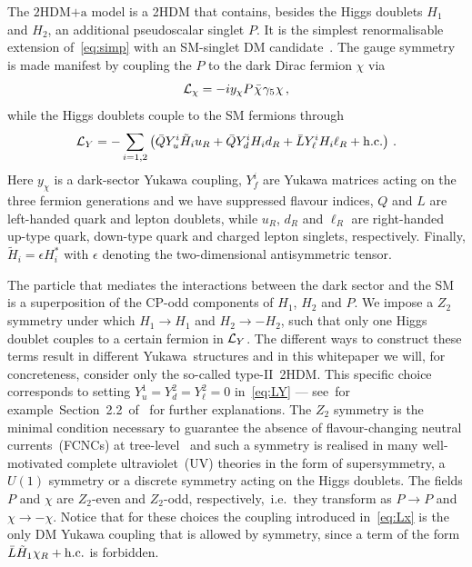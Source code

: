 \documentclass[a4paper, 11pt,notoc]{article}
\newcommand{\hdma}{\ensuremath{\textrm{2HDM+a}}\xspace}
\begin{document}
The \hdma model is a 2HDM that contains, besides the Higgs doublets $H_1$ and $H_2$, an additional pseudoscalar singlet $P$. It is the simplest renormalisable extension of~\eqref{eq:simp} with an SM-singlet DM candidate~\cite{Ipek:2014gua,No:2015xqa,Goncalves:2016iyg,Bauer:2017ota,Tunney:2017yfp}. The gauge symmetry is made manifest by coupling the $P$ to the dark Dirac fermion  $\chi$ via
\begin{equation} \label{eq:Lx}
{\cal L}_\chi = - i y_\chi P \hspace{0.25mm} \bar \chi \hspace{0.25mm} \gamma_5 \hspace{0.1mm} \chi \,,
\end{equation}
while the Higgs doublets couple to the SM fermions through
\begin{equation} \label{eq:LY}
{\cal L}_{Y} = - \sum_{i=1,2} \left ( \bar Q Y_u^i \tilde H_i u_R  + \bar Q Y_d^i H_i d_R   + \bar L Y_\ell^i H_i \ell_R  + {\rm h.c.}  \right ) \,.
\end{equation}
Here $y_\chi$ is a dark-sector Yukawa coupling, $Y_f^i$ are Yukawa matrices acting on the three fermion generations and we have suppressed flavour indices, $Q$ and $L$ are left-handed quark and lepton doublets, while $u_R$, $d_R$ and $\ell_R$ are right-handed up-type quark, down-type quark and charged lepton singlets, respectively. Finally, $\tilde H_i = \epsilon H_i^\ast$ with $\epsilon$ denoting the  two-dimensional antisymmetric tensor.

The particle that mediates the interactions between the dark sector and the SM is a superposition of the CP-odd components of $H_1$, $H_2$ and $P$. We impose a $Z_2$ symmetry under which $H_1\to H_1$ and $H_2\to -H_2$, such that only one Higgs doublet couples to a certain fermion in ${\cal L}_{Y}$. The different ways to construct these terms result in different Yukawa~structures and in this whitepaper we will, for concreteness, consider only the so-called type-II~2HDM. This specific choice corresponds to setting $Y_u^1  = Y_d^2 = Y_\ell^2 =0$ in~\eqref{eq:LY} --- see~for example~Section~2.2~of~\cite{Bauer:2017ota} for further explanations.  The $Z_2$ symmetry is the minimal condition necessary to guarantee the absence of flavour-changing neutral currents~(FCNCs) at tree-level~\cite{Glashow:1976nt,Paschos:1976ay} and such a symmetry is realised in many well-motivated complete ultraviolet~(UV) theories in the form of supersymmetry, a $U(1)$ symmetry or  a discrete symmetry acting on the Higgs doublets. The fields $P$ and $\chi$ are $Z_2$-even and $Z_2$-odd, respectively,~i.e.~they transform as $P \to P$ and $\chi \to -\chi$. Notice that for these choices the coupling introduced in~\eqref{eq:Lx} is the only DM Yukawa coupling that is allowed by symmetry, since  a term of the form $\bar L  \tilde H_1 \chi_R + {\rm h.c.}$ is forbidden. 
\end{document}
